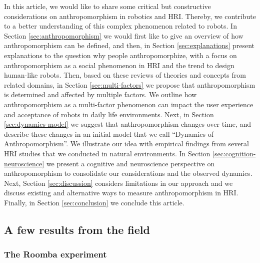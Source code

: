 \documentclass{frontiersSCNS} %
\begin{document}
In this article, we would like to share some critical but constructive
considerations on anthropomorphism in robotics and HRI. Thereby, we contribute
to a better understanding of this complex phenomenon related to robots. In
Section \ref{sec:anthropomorphism} we would first like to give an overview of
how anthropomorphism can be defined, and then, in Section \ref{sec:explanations}
present explanations to the question why people anthropomorphize, with a focus
on anthropomorphism as a social phenomenon in HRI and the trend to design
human-like robots. Then, based on these reviews of theories and concepts from
related domains, in Section \ref{sec:multi-factors} we propose that
anthropomorphism is determined and affected by multiple factors. We outline how
anthropomorphism as a multi-factor phenomenon can impact the user experience and
acceptance of robots in daily life environments. Next, in Section
\ref{sec:dynamics-model} we suggest that anthropomorphism changes over time, and
describe these changes in an initial model that we call ``Dynamics of
Anthropomorphism''. We illustrate our idea with empirical findings from several
HRI studies that we conducted in natural environments. In Section
\ref{sec:cognition-neuroscience} we present a cognitive and neuroscience
perspective on anthropomorphism to consolidate our considerations and the
observed dynamics. Next, Section \ref{sec:discussion} considers limitations in
our approach and we discuss existing and alternative ways to measure
anthropomorphism in HRI. Finally, in Section \ref{sec:conclusion} we conclude
this article. 


\subsection{A few results from the field}

\subsubsection{The Roomba experiment}
\end{document}
